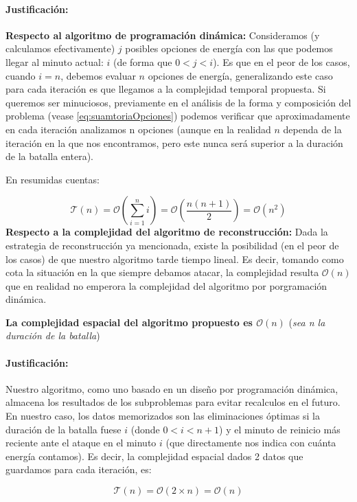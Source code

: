 \paragraph{Justificación:}\newline
\textbf{Respecto al algoritmo de programación dinámica:}
Consideramos (y calculamos efectivamente) $j$ posibles opciones de energía con las que podemos llegar al minuto actual: $i$ (de forma que $0<j<i$). Es que en el peor de los casos, cuando $i=n$, debemos evaluar $n$ opciones de energía, generalizando este caso para cada iteración es que llegamos a la complejidad temporal propuesta. Si queremos ser minuciosos, previamente en el análisis de la forma y composición del problema (vease \ref{eq:suamtoriaOpciones}) podemos verificar que aproximadamente en cada iteración analizamos n opciones (aunque en la realidad $n$ dependa de la iteración en la que nos encontramos, pero este nunca será superior a la duración de la batalla entera).

En resumidas cuentas:

\begin{equation*}
    \mathcal{T}(n)=\mathcal{O}(\sum_{i=1}^{n} i )=\mathcal{O}(\frac{n(n+1)}{2})=\mathcal{O}(n^2)
\end{equation*}
\textbf{Respecto a la complejidad del algoritmo de reconstrucción: } Dada la estrategia de reconstrucción ya mencionada, existe la posibilidad (en el peor de los casos) de que nuestro algoritmo tarde tiempo lineal. Es decir, tomando como cota la situación en la que siempre debamos atacar, la complejidad resulta $\mathcal{O}(n)$ que en realidad no emperora la complejidad del algoritmo por porgramación dinámica. 



\textbf{La complejidad espacial del algoritmo propuesto es  $\mathcal{O}(n)$ } (\textit{sea n la duración de la batalla})
\paragraph{Justificación:} Nuestro algoritmo, como uno basado en un diseño por programación dinámica, almacena los resultados de los subproblemas para evitar recalculos en el futuro. En nuestro caso, los datos memorizados son las eliminaciones óptimas si la duración de la batalla fuese $i$ (donde $0<i<n+1$) y el minuto de reinicio más reciente ante el ataque en el minuto $i$ (que directamente nos indica con cuánta energía contamos). Es decir, la complejidad espacial dados 2 datos que guardamos para cada iteración, es:

\begin{equation*}
    \mathcal{T}(n)=\mathcal{O}(2\times n)=\mathcal{O}(n)
\end{equation*}
 


